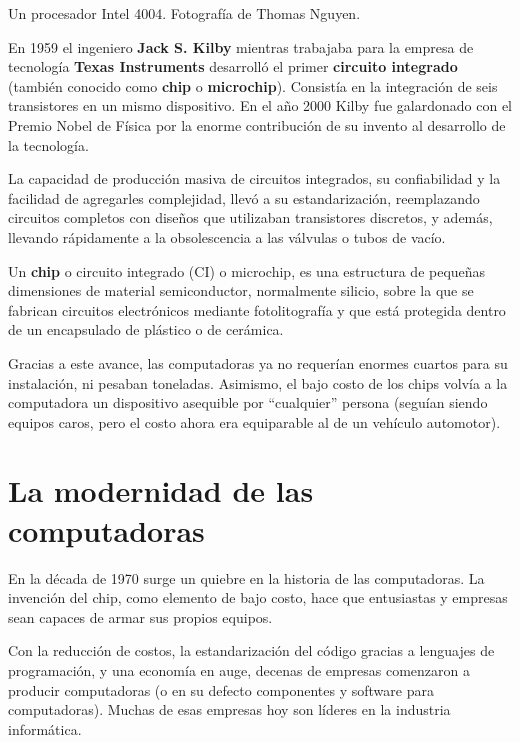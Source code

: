 {Un procesador Intel 4004.} {Fotografía de Thomas Nguyen.}

 En
1959 el ingeniero \textbf{Jack S. Kilby} mientras trabajaba para la empresa de
tecnología \textbf{Texas Instruments} desarrolló el primer \textbf{circuito
integrado} (también conocido como \textbf{chip} o \textbf{microchip}). Consistía
en la integración de seis transistores en un mismo dispositivo. En el año 2000
Kilby fue galardonado con el Premio Nobel de Física por la enorme contribución
de su invento al desarrollo de la tecnología.\autocite{reid_2001}

La capacidad de producción masiva de circuitos integrados, su confiabilidad y la
facilidad de agregarles complejidad, llevó a su estandarización, reemplazando
circuitos completos con diseños que utilizaban transistores discretos, y además,
llevando rápidamente a la obsolescencia a las válvulas o tubos de vacío.

\begin{definition}
     Un \textbf{chip} o
    circuito integrado (CI) o microchip, es una estructura de pequeñas
    dimensiones de material semiconductor, normalmente silicio, sobre la que se
    fabrican circuitos electrónicos mediante fotolitografía y que está protegida
    dentro de un encapsulado de plástico o de cerámica.
\end{definition}

Gracias a este avance, las computadoras ya no requerían enormes cuartos para su
instalación, ni pesaban toneladas. Asimismo, el bajo costo de los chips volvía a
la computadora un dispositivo asequible por ``cualquier'' persona (seguían
siendo equipos caros, pero el costo ahora era equiparable al de un vehículo
automotor).

\section{La modernidad de las computadoras}
\label{chap:historia_computadoras:sec:modernidad}

En la década de 1970 surge un quiebre en la historia de las computadoras. La
invención del chip, como elemento de bajo costo, hace que entusiastas y empresas
sean capaces de armar sus propios equipos.

Con la reducción de costos, la estandarización del código gracias a lenguajes de
programación, y una economía en auge, decenas de empresas comenzaron a producir
computadoras (o en su defecto componentes y software para computadoras). Muchas
de esas empresas hoy son líderes en la industria informática.

